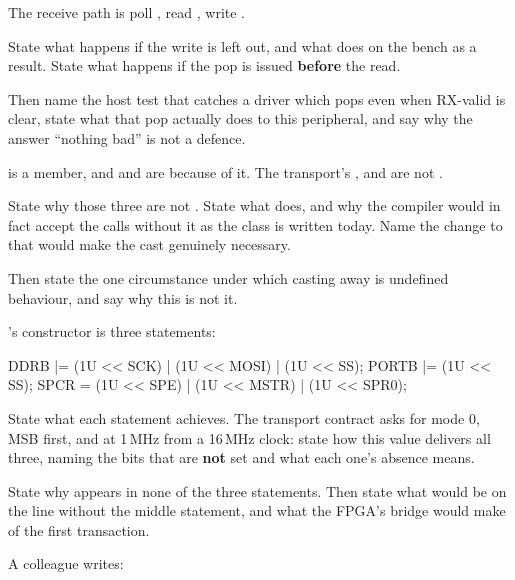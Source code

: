  The receive path is poll , read , write .

State what happens if the  write is left out, and what  does on the
bench as a result. State what happens if the pop is issued \textbf{before} the  read.

Then name the host test that catches a driver which pops even when RX-valid is clear, state what
that pop actually does to this peripheral, and say why the answer ``nothing bad'' is not a defence.

  is a  member, and  and  are
 because of it. The transport's ,  and  are
not .

State why those three are not . State what
 does, and why the compiler would in fact accept
the calls without it as the class is written today. Name the change to  that would make
the cast genuinely necessary.

Then state the one circumstance under which casting away  is undefined behaviour, and
say why this is not it. 

\label{exa:q:7}

 's constructor is three statements:

\begin{cppcode}
DDRB  |= (1U << SCK) | (1U << MOSI) | (1U << SS);
PORTB |= (1U << SS);
SPCR   = (1U << SPE) | (1U << MSTR) | (1U << SPR0);
\end{cppcode}

\noindent State what each statement achieves. The transport contract asks for mode 0, MSB first, and
 at 1\,MHz from a 16\,MHz clock: state how this  value delivers all three,
naming the bits that are \textbf{not} set and what each one's absence means.

State why  appears in none of the three statements. Then state what would be on the
 line without the middle statement, and what the FPGA's bridge would make of the first
transaction. 

 A colleague writes:

